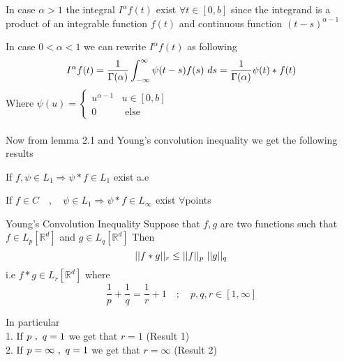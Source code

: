 In case $\alpha > 1$ the integral $I^\alpha f(t)$ exist $\forall t \in [0, b]$ since the integrand is a product 
of an integrable function $f(t)$ and continuous function $(t-s)^{\alpha-1}$

In case $ 0 < \alpha < 1$ we can rewrite $I^\alpha f(t)$ as following
\[
    I^\alpha f(t) = \frac{1}{\Gamma(\alpha)}\int_{-\infty}^{\infty} \psi(t-s)f(s) \,\, ds  = \frac{1}{\Gamma(\alpha)} \psi(t) * f(t)
\]
Where 
    \(
    \psi(u) = 
    \begin{cases}
        \displaystyle u^{\alpha-1}  &u \in [0,b]
        \\
        \displaystyle 0  &\text{ else } 
    \end{cases}
    \)
    \\\\
Now from lemma 2.1 and Young's convolution inequality we get the following results
\vspace*{-.2cm}
\begin{result}
    If $f,\psi \in L_1 \Longrightarrow \psi * f \in L_1$ exist a.e
\end{result}
\vspace*{-.2cm}
\begin{result}
    If $f \in C \quad,\quad \psi \in L_1 \Longrightarrow \psi * f \in L_\infty$ exist $\forall$points
\end{result}

\begin{enrichment*}{Young's Convolution Inequality}
    Suppose that $f,g$ are two functions such that $f \in L_p[\mathbb{R}^d]$ and 
    $g \in L_q[\mathbb{R}^d]$ Then 
    \[
    ||f*g||_{r} \leq ||f||_{p} \,\, ||g||_{q}
    \]
    i.e $f*g \in L_r[\mathbb{R}^d]$
    where
    \begin{equation}
        \frac{1}{p} + \frac{1}{q} = \frac{1}{r} + 1 \quad ; \quad p,q,r \in [1,\infty]
    \end{equation}
\end{enrichment*}
In particular 
\\
1. If $p \,\,,\,\, q = 1$ we get that $r=1$ (Result 1)
\\
2. If $p = \infty \,\,,\,\, q = 1$ we get that $r=\infty$ (Result 2)

